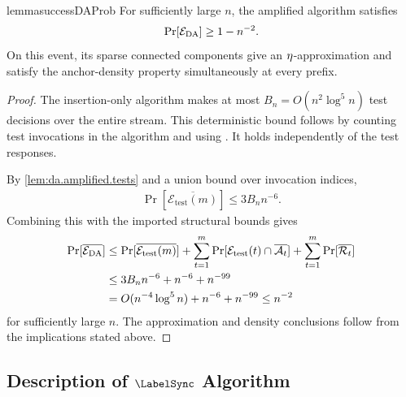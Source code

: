 \begin{restatable}{lemma}{successDAProb}
    \label{lem:da.whole.run.success}
    For sufficiently large $ n $, the amplified algorithm satisfies
    \begin{align}
        \Pr[\mathcal{E}_{\rm DA}]\ge1-n^{-2}.
    \end{align}
    On this event, its sparse connected components give an $ \eta $-approximation and satisfy the anchor-density property simultaneously at every prefix.
\end{restatable}

\begin{proof}
    The insertion-only algorithm makes at most $ B_n=O(n^2\log^5 n) $ test decisions over the entire stream.
    This deterministic bound follows by counting test invocations in the algorithm and using \cite[Lemma~40]{CLMP2024Dynamic}.
    It holds independently of the test responses.

    By \cref{lem:da.amplified.tests} and a union bound over invocation indices,
    \begin{align}
        \Pr[\overline{\mathcal E_{\mathrm{test}}(m)}]
        \le 3B_n n^{-6}.
    \end{align}
    Combining this with the imported structural bounds gives
    \begin{align}
        \Pr[\overline{\mathcal{E}_{\rm DA}}]
        &\le
        \Pr[\overline{\mathcal E_{\mathrm{test}}(m)}]
        +
        \sum_{t=1}^{m}
        \Pr[
            \mathcal E_{\mathrm{test}}(t)
            \cap\overline{\mathcal A_t}
        ]
        +
        \sum_{t=1}^{m}
        \Pr[\overline{\mathcal R_t}] \\
        &\le 3B_n n^{-6}+n^{-6}+n^{-99} \\
        &=O(n^{-4}\log^5 n)+n^{-6}+n^{-99}
        \le n^{-2}
    \end{align}
    for sufficiently large $ n $.
    The approximation and density conclusions follow from the implications stated above.
\end{proof}



\subsection{Description of \texorpdfstring{$ \LabelSync $}{LabelSync} Algorithm}\label{sub:description_of_LabelSync} %

